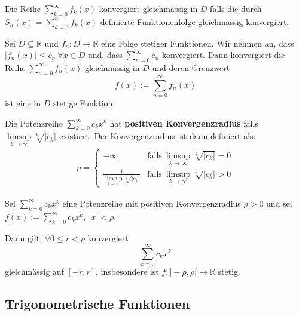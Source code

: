 \documentclass[8pt,a4paper,twocolumn,table]{extarticle}
\newcommand{\R}{\mathbb{R}}
\begin{document}
\begin{definition}{3.37}
    Die Reihe $\sum_{k=0}^\infty f_k(x)$ konvergiert gleichmässig in $D$ falls die durch $S_n(x) = \sum_{k=0}^n f_k(x)$ definierte
    Funktionenfolge gleichmässig konvergiert.
\end{definition}

\begin{satz}{3.38}
    Sei $D \subseteq \R$ und $f_n : D \to \R$ eine Folge stetiger Funktionen. Wir nehmen an, dass $|f_n(x)| \le c_n\ \forall x \in D$
    und, dass $\sum_{n=0}^\infty c_n$ konvergiert. Dann konvergiert die Reihe $\sum_{n=0}^\infty f_n(x)$ gleichmässig in $D$ und deren Grenzwert
    \[ f(x) := \sum_{n=0}^\infty f_n(x) \]
    ist eine in $D$ stetige Funktion.
\end{satz}

\begin{definition}{3.39}
    Die Potenzreihe $\sum_{k=0}^\infty c_k x^k$ hat \textbf{positiven Konvergenzradius} falls $\underset{k \to \infty}{\limsup} \sqrt[k]{|c_k|}$ existiert.
    Der Konvergenzradius ist dann definiert als:
    \begin{align*}
        \rho = \begin{cases}
            +\infty                                                    & \mbox{falls}\ \underset{k \to \infty}{\limsup} \sqrt[k]{|c_k|} = 0 \\
            \frac{1}{\underset{k \to \infty}{\limsup} \sqrt[k]{|c_k|}} & \mbox{falls}\ \underset{k \to \infty}{\limsup} \sqrt[k]{|c_k|} > 0
        \end{cases}
    \end{align*}
\end{definition}

\begin{satz}{3.40}
    Sei $\sum_{k=0}^\infty c_k x^k$ eine Potenzreihe mit positiven Konvergenzradius $\rho > 0$ und sei
    $f(x) := \sum_{k = 0}^\infty c_k x^k,\ |x| < \rho$.

    Dann gilt: $\forall 0 \le r < \rho$ konvergiert
    \[ \sum_{k=0}^\infty c_k x^k \]
    gleichmässig auf $[-r, r]$, insbesondere ist $f: ]-\rho, \rho[ \to \R$ stetig.
\end{satz}

\subsection{Trigonometrische Funktionen}
\end{document}
